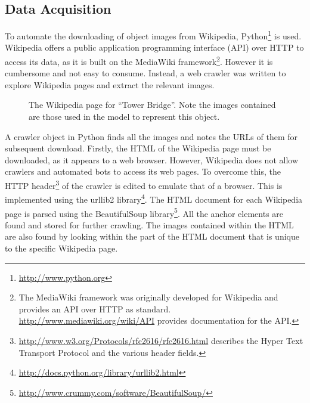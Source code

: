 \documentclass[11pt, onecolumn, a4paper, final]{report} %
\begin{document}
\subsection{Data Acquisition}

To automate the downloading of object images from Wikipedia, Python\footnote{\url{http://www.python.org}} is used. Wikipedia offers a public application programming interface (API) over HTTP to access its data, as it is built on the MediaWiki framework\footnote{The MediaWiki framework was originally developed for Wikipedia and provides an API over HTTP as standard. \url{http://www.mediawiki.org/wiki/API} provides documentation for the API.}. However it is cumbersome and not easy to consume. Instead, a web crawler was written to explore Wikipedia pages and extract the relevant images. 

\begin{figure}[htb]
\centering 
{}
\caption{The Wikipedia page for ``Tower Bridge''. Note the images contained are those used in the model to represent this object.}
\label{fig:wikipage}
\end{figure}

A crawler object in Python finds all the images and notes the URLs of them for subsequent download. Firstly, the HTML of the Wikipedia page must be downloaded, as it appears to a web browser. However, Wikipedia does not allow crawlers and automated bots to access its web pages. To overcome this, the HTTP header\footnote{\url{http://www.w3.org/Protocols/rfc2616/rfc2616.html} describes the Hyper Text Transport Protocol and the various header fields.} of the crawler is edited to emulate that of a browser. This is implemented using the urllib2 library\footnote{\url{http://docs.python.org/library/urllib2.html}}. The HTML document for each Wikipedia page is parsed using the BeautifulSoup library\footnote{\url{http://www.crummy.com/software/BeautifulSoup/}}. All the anchor elements are found and stored for further crawling. The images contained within the HTML are also found by looking within the part of the HTML document that is unique to the specific Wikipedia page.
\end{document}
